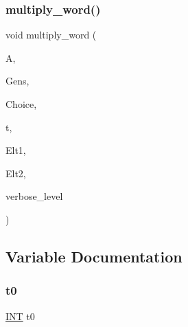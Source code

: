 \subsubsection{\texorpdfstring{multiply\+\_\+word()}{multiply\_word()}}
{\footnotesize\ttfamily void multiply\+\_\+word (\begin{DoxyParamCaption}\item[{\mbox{\hyperlink{classaction}{action}} $\ast$}]{A,  }\item[{\mbox{\hyperlink{galois_8h_a09fddde158a3a20bd2dcadb609de11dc}{I\+NT}} $\ast$$\ast$}]{Gens,  }\item[{\mbox{\hyperlink{galois_8h_a09fddde158a3a20bd2dcadb609de11dc}{I\+NT}} $\ast$}]{Choice,  }\item[{\mbox{\hyperlink{galois_8h_a09fddde158a3a20bd2dcadb609de11dc}{I\+NT}}}]{t,  }\item[{\mbox{\hyperlink{galois_8h_a09fddde158a3a20bd2dcadb609de11dc}{I\+NT}} $\ast$}]{Elt1,  }\item[{\mbox{\hyperlink{galois_8h_a09fddde158a3a20bd2dcadb609de11dc}{I\+NT}} $\ast$}]{Elt2,  }\item[{\mbox{\hyperlink{galois_8h_a09fddde158a3a20bd2dcadb609de11dc}{I\+NT}}}]{verbose\+\_\+level }\end{DoxyParamCaption})}



\subsection{Variable Documentation}
\mbox{\label{burnside_8_c_a4268f4fe222ffb119218a0199f5e1904}} 
\subsubsection{\texorpdfstring{t0}{t0}}
{\footnotesize\ttfamily \mbox{\hyperlink{galois_8h_a09fddde158a3a20bd2dcadb609de11dc}{I\+NT}} t0}

